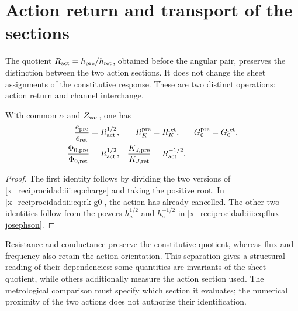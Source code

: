 \section{Action return and transport of the sections}

The quotient $R_{\rm act}=h_{\rm pre}/h_{\rm ret}$, obtained before the
angular pair, preserves the distinction between the two action sections.
It does not change the sheet assignments of the constitutive response. These are
two distinct operations: action return and channel interchange.

\begin{proposition}
With common $\alpha$ and $Z_{\rm vac}$, one has
\begin{align}
 \frac{e_{\rm pre}}{e_{\rm ret}}&=R_{\rm act}^{1/2},
 &R_K^{\rm pre}&=R_K^{\rm ret},
 &G_0^{\rm pre}&=G_0^{\rm ret},\label{x_reciprocidad:iii:eq:charge-return}\\
 \frac{\Phi_{0,\rm pre}}{\Phi_{0,\rm ret}}&=R_{\rm act}^{1/2},
 &\frac{K_{J,\rm pre}}{K_{J,\rm ret}}&=R_{\rm act}^{-1/2}.
 \label{x_reciprocidad:iii:eq:flux-return}
\end{align}
\end{proposition}
\begin{proof}
The first identity follows by dividing the two versions of
\eqref{x_reciprocidad:iii:eq:charge} and taking the positive root. In
\eqref{x_reciprocidad:iii:eq:rk-g0}, the action has already cancelled. The other two
identities follow from the powers $h_a^{1/2}$ and $h_a^{-1/2}$ in
\eqref{x_reciprocidad:iii:eq:flux-josephson}.
\end{proof}

Resistance and conductance preserve the constitutive quotient, whereas
flux and frequency also retain the action orientation. This
separation gives a structural reading of their dependencies: some quantities
are invariants of the sheet quotient, while others additionally measure the
action section used. The metrological comparison must specify which section it evaluates;
the numerical proximity of the two actions does not authorize their identification.



